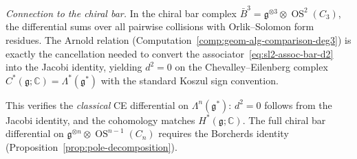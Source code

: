 \begin{computation}
\emph{Connection to the chiral bar.}
In the chiral bar complex
$\bar{B}^3 = \mathfrak{g}^{\otimes 3} \otimes \operatorname{OS}^2(C_3)$,
the differential sums over all pairwise collisions with
Orlik--Solomon form residues. The Arnold relation
(Computation~\ref{comp:geom-alg-comparison-deg3}) is
exactly the cancellation needed to convert the
associator~\eqref{eq:sl2-assoc-bar-d2} into the Jacobi identity,
yielding $d^2 = 0$ on the Chevalley--Eilenberg complex
$C^*(\mathfrak{g}; \mathbb{C}) = \Lambda^*(\mathfrak{g}^*)$
with the standard Koszul sign convention.

This verifies the \emph{classical} CE differential on
$\Lambda^n(\mathfrak{g}^*)$: $d^2 = 0$ follows from the Jacobi identity,
and the cohomology matches $H^*(\mathfrak{g}; \mathbb{C})$.
The full chiral bar differential on
$\mathfrak{g}^{\otimes n} \otimes \operatorname{OS}^{n-1}(C_n)$
requires the Borcherds identity
(Proposition~\ref{prop:pole-decomposition}).
\end{computation}

